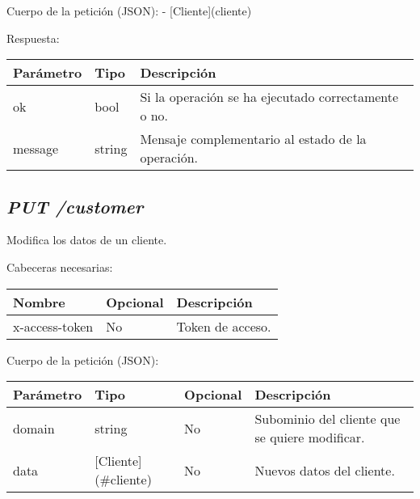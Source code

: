 Cuerpo de la petición (JSON):
- [Cliente](cliente)


Respuesta:
\begin{table}[!h]
	\centering
	\begin{adjustbox}{max width=\textwidth}
	\begin{tabular}{|l|l|l|}
		\hline
		Parámetro & Tipo & Descripción \\ \hline
		ok & bool & Si la operación se ha ejecutado correctamente o no. \\ \hline
		message & string & Mensaje complementario al estado de la operación. \\ \hline
	\end{tabular}
\end{adjustbox}
\end{table}



\subsection{\textit{PUT /customer}}
Modifica los datos de un cliente.

Cabeceras necesarias:
\begin{table}[h!]
	\centering
	\begin{adjustbox}{max width=\textwidth}
	\begin{tabular}{|l|l|l|}
		\hline
		Nombre & Opcional & Descripción \\ \hline
		x-access-token & No & Token de acceso. \\ \hline
	\end{tabular}
\end{adjustbox}
\end{table}

Cuerpo de la petición (JSON):
\begin{table}[!h]
	\centering
	\begin{adjustbox}{max width=\textwidth}
	\begin{tabular}{|l|l|l|l|}
		\hline
		Parámetro & Tipo & Opcional & Descripción \\ \hline
		domain & string & No & Subominio del cliente que se quiere modificar. \\ \hline
		data & [Cliente](\#cliente) & No & Nuevos datos del cliente. \\ \hline
	\end{tabular}
\end{adjustbox}
\end{table}

